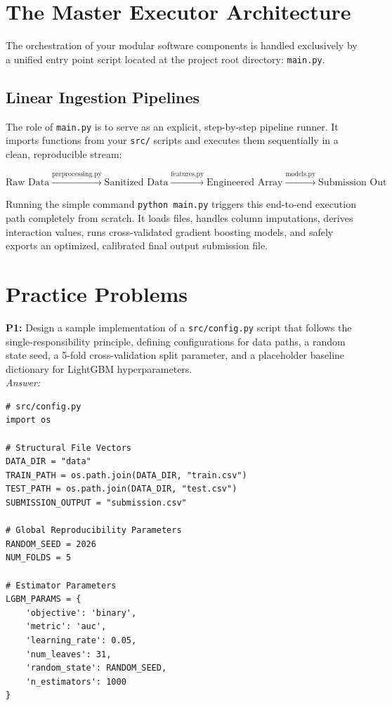 \documentclass{article}
\begin{document}
\section{The Master Executor Architecture}
The orchestration of your modular software components is handled exclusively by a unified entry point script located at the project root directory: \texttt{main.py}.

\subsection{Linear Ingestion Pipelines}
The role of \texttt{main.py} is to serve as an explicit, step-by-step pipeline runner. It imports functions from your \texttt{src/} scripts and executes them sequentially in a clean, reproducible stream:

\begin{equation}
    \text{Raw Data} \xrightarrow{\text{preprocessing.py}} \text{Sanitized Data} \xrightarrow{\text{features.py}} \text{Engineered Array} \xrightarrow{\text{models.py}} \text{Submission Out}
\end{equation}

Running the simple command \texttt{python main.py} triggers this end-to-end execution path completely from scratch. It loads files, handles column imputations, derives interaction values, runs cross-validated gradient boosting models, and safely exports an optimized, calibrated final output submission file.

\newpage
\section{Practice Problems}

\textbf{P1:} Design a sample implementation of a \texttt{src/config.py} script that follows the single-responsibility principle, defining configurations for data paths, a random state seed, a 5-fold cross-validation split parameter, and a placeholder baseline dictionary for LightGBM hyperparameters.
\\
\textit{Answer:}
\begin{verbatim}
# src/config.py
import os

# Structural File Vectors
DATA_DIR = "data"
TRAIN_PATH = os.path.join(DATA_DIR, "train.csv")
TEST_PATH = os.path.join(DATA_DIR, "test.csv")
SUBMISSION_OUTPUT = "submission.csv"

# Global Reproducibility Parameters
RANDOM_SEED = 2026
NUM_FOLDS = 5

# Estimator Parameters
LGBM_PARAMS = {
    'objective': 'binary',
    'metric': 'auc',
    'learning_rate': 0.05,
    'num_leaves': 31,
    'random_state': RANDOM_SEED,
    'n_estimators': 1000
}
\end{verbatim}
\end{document}
